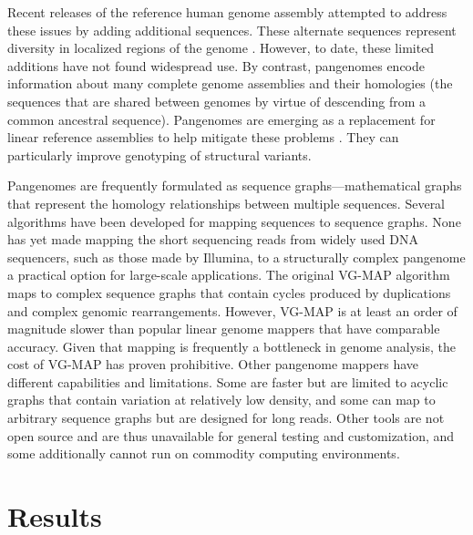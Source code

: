 \documentclass[11pt]{ucscthesis}
\begin{document}
Recent releases of the reference human genome assembly attempted to address these issues by adding additional sequences.
These alternate sequences represent diversity in localized regions of the genome \cite{church_modernizing_2011}.
However, to date, these limited additions have not found widespread use. By contrast, pangenomes encode information about many complete genome assemblies and their homologies (the sequences that are shared between genomes by virtue of descending from a common ancestral sequence).
Pangenomes are emerging as a replacement for linear reference assemblies to help mitigate these problems \cite{noauthor_computational_2016,sherman_pan-genomics_2020,ballouz_is_2019}.
They can particularly improve genotyping of structural variants\cite{hickey_vgsv_2020}.

Pangenomes are frequently formulated as sequence graphs\cite{eizenga_pangenome_2020}—mathematical graphs that represent the homology relationships between multiple sequences.
Several algorithms have been developed for mapping sequences to sequence graphs.
None has yet made mapping the short sequencing reads from widely used DNA sequencers, such as those made by Illumina, to a structurally complex pangenome a practical option for large-scale applications.
The original VG-MAP algorithm\cite{garrison_variation_2018} maps to complex sequence graphs that contain cycles produced by duplications and complex genomic rearrangements\cite{garrison_variation_2018}.
However, VG-MAP is at least an order of magnitude slower than popular linear genome mappers that have comparable accuracy.
Given that mapping is frequently a bottleneck in genome analysis, the cost of VG-MAP has proven prohibitive. Other pangenome mappers have different capabilities and limitations.
Some are faster but are limited to acyclic graphs that contain variation at relatively low density\cite{kim_hisat2_2019}, and some can map to arbitrary sequence graphs but are designed for long reads\cite{rautiainen_graphaligner_2020}. Other tools are not open source and are thus unavailable for general testing and customization\cite{sevenbridges_2019,illumina_dragen_2019}, and some additionally cannot run on commodity computing environments\cite{illumina_dragen_2019}.

\section{Results}
\end{document}
